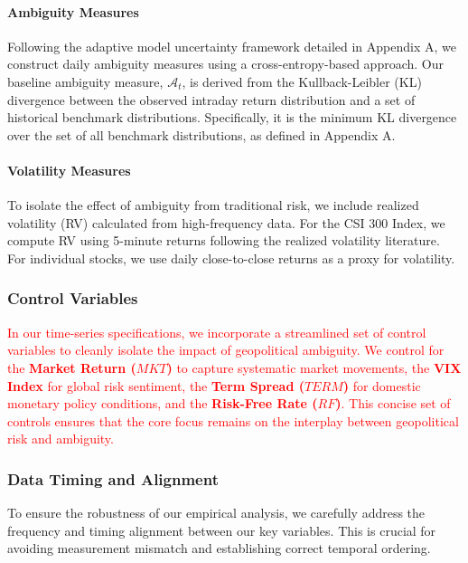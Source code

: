 \documentclass[preprint,12pt,authoryear]{elsarticle}
\begin{document}
\paragraph{Ambiguity Measures}
Following the adaptive model uncertainty framework detailed in Appendix A, we construct daily ambiguity measures using a cross-entropy-based approach. Our baseline ambiguity measure, $\mathcal{A}_t$, is derived from the Kullback-Leibler (KL) divergence between the observed intraday return distribution and a set of historical benchmark distributions. Specifically, it is the minimum KL divergence over the set of all benchmark distributions, as defined in Appendix A.


\paragraph{Volatility Measures}
To isolate the effect of ambiguity from traditional risk, we include realized volatility (RV) calculated from high-frequency data. For the CSI 300 Index, we compute RV using 5-minute returns following the realized volatility literature. For individual stocks, we use daily close-to-close returns as a proxy for volatility.

\subsubsection{Control Variables}

\textcolor{red}{In our time-series specifications, we incorporate a streamlined set of control variables to cleanly isolate the impact of geopolitical ambiguity. We control for the \textbf{Market Return ($MKT$)} to capture systematic market movements, the \textbf{VIX Index} for global risk sentiment, the \textbf{Term Spread ($TERM$)} for domestic monetary policy conditions, and the \textbf{Risk-Free Rate ($RF$)}. This concise set of controls ensures that the core focus remains on the interplay between geopolitical risk and ambiguity.} 

\subsubsection{Data Timing and Alignment}
To ensure the robustness of our empirical analysis, we carefully address the frequency and timing alignment between our key variables. This is crucial for avoiding measurement mismatch and establishing correct temporal ordering.
\end{document}
